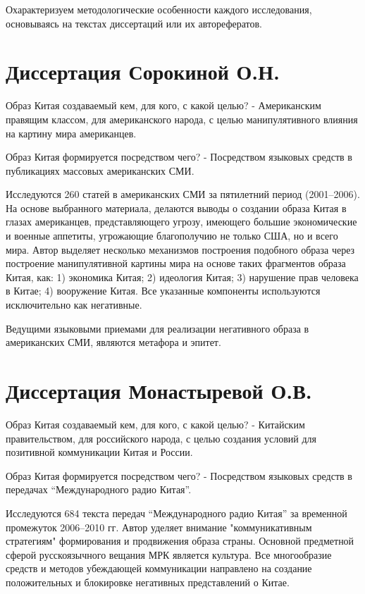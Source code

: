 \documentclass[11pt]{article}
\begin{document}
Охарактеризуем методологические особенности каждого исследования, основываясь на текстах диссертаций или их авторефератов.

\section{Диссертация Сорокиной О.Н.}\label{sec:section-sorokina}

Образ Китая создаваемый кем, для кого, с какой целью?
- Американским правящим классом, для американского народа, с целью манипулятивного влияния на картину мира американцев.

Образ Китая формируется посредством чего?
- Посредством языковых средств в публикациях массовых американских СМИ.

Исследуются 260 статей в американских СМИ за пятилетний период (2001--2006).
На основе выбранного материала, делаются выводы о создании образа Китая в глазах американцев, представляющего угрозу, имеющего большие экономические и военные аппетиты, угрожающие благополучию не только США, но и всего мира.
Автор выделяет несколько механизмов построения подобного образа через построение манипулятивной картины мира на основе таких фрагментов образа Китая, как: 1) экономика Китая;
2) идеология Китая;
3) нарушение прав человека в Китае;
4) вооружение Китая.
Все указанные компоненты используются исключительно как негативные.

Ведущими языковыми приемами для реализации негативного образа в американских СМИ, являются метафора и эпитет.

\section{Диссертация Монастыревой О.В.}\label{sec:section-monastyreva}

Образ Китая создаваемый кем, для кого, с какой целью?
- Китайским правительством, для российского народа, с целью создания условий для позитивной коммуникации Китая и России.

Образ Китая формируется посредством чего?
- Посредством языковых средств в передачах ``Международного радио Китая''.

Исследуются 684 текста передач ``Международного радио Китая'' за временной промежуток 2006--2010 гг.
Автор уделяет внимание "коммуникативным стратегиям" формирования и продвижения образа страны.
Основной предметной сферой русскоязычного вещания МРК является культура.
Все многообразие средств и методов убеждающей коммуникации направлено на создание положительных и блокировке негативных представлений о Китае.
\end{document}
